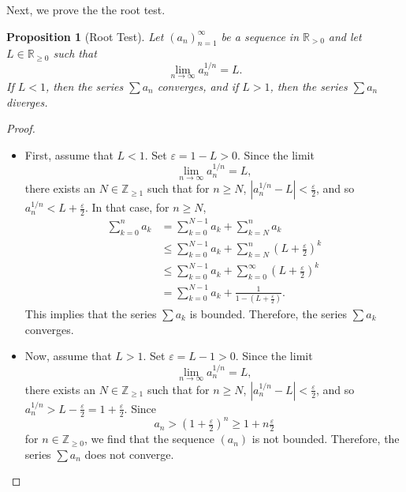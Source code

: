 \documentclass[a4paper, openany]{memoir}
\theoremstyle{definition}
\theoremstyle{plain}
\newtheorem{proposition}[definition]{Proposition}
\begin{document}
\noindent Next, we prove the the root test.
\begin{proposition}[Root Test]
Let $(a_n)_{n=1}^{\infty}$ be a sequence in $\mathbb{R}_{> 0}$ and let $L \in \mathbb{R}_{\geqslant 0}$ such that
\[\lim_{n \to \infty} a_n^{1/n} = L.\]
If $L < 1$, then the series $\sum a_n$ converges, and if $L > 1$, then the series $\sum a_n$ diverges.
\end{proposition}
\begin{proof}
\hspace*{0pt}
\begin{itemize}
    \item First, assume that $L < 1$. Set $\varepsilon = 1 - L > 0$. Since the limit 
    \[\lim_{n \to \infty} a_n^{1/n} = L,\]
    there exists an $N \in \mathbb{Z}_{\geqslant 1}$ such that for $n \geqslant N$, $|a_n^{1/n} - L| < \frac{\varepsilon}{2}$, and so $a_n^{1/n} < L + \frac{\varepsilon}{2}$. In that case, for $n \geqslant N$,
    \begin{align*}
        \sum_{k=0}^n a_k &= \sum_{k=0}^{N-1} a_k + \sum_{k=N}^n a_k \\
        &\leqslant \sum_{k=0}^{N-1} a_k + \sum_{k=N}^n (L + \tfrac{\varepsilon}{2})^k \\
        &\leqslant \sum_{k=0}^{N-1} a_k + \sum_{k=0}^{\infty} (L + \tfrac{\varepsilon}{2})^k \\
        &= \sum_{k=0}^{N-1} a_k + \frac{1}{1 - (L + \tfrac{\varepsilon}{2})}.
    \end{align*}
    This implies that the series $\sum a_k$ is bounded. Therefore, the series $\sum a_k$ converges.
    
    \item Now, assume that $L > 1$. Set $\varepsilon = L - 1 > 0$. Since the limit 
    \[\lim_{n \to \infty} a_n^{1/n} = L,\]
    there exists an $N \in \mathbb{Z}_{\geqslant 1}$ such that for $n \geqslant N$, $|a_n^{1/n} - L| < \frac{\varepsilon}{2}$, and so $a_n^{1/n} > L - \frac{\varepsilon}{2} = 1 + \frac{\varepsilon}{2}$. Since 
    \[a_n > (1 + \tfrac{\varepsilon}{2})^n \geqslant 1 + n\tfrac{\varepsilon}{2}\]
    for $n \in \mathbb{Z}_{\geqslant 0}$, we find that the sequence $(a_n)$ is not bounded. Therefore, the series $\sum a_n$ does not converge.
\end{itemize}
\end{proof}
\newpage
\end{document}
